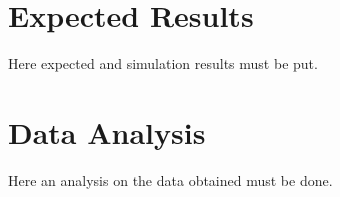 \section{Expected Results}
Here expected and simulation results must be put.

\section{Data Analysis}
Here an analysis on the data obtained must be done.
